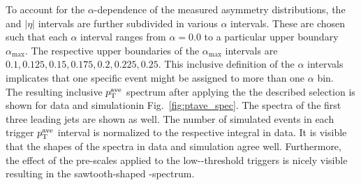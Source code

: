 \begin{table}[!t]
\centering
\caption{Overview of the $|\eta|$ and $\pt^\mathrm{ave}$ interval boundaries used for the resolution measurement.}
\label{tab:binning}
\end{table} 
To account for the $\alpha$-dependence of the measured asymmetry distributions, the \ptave and $|\eta|$ intervals are further subdivided in various $\alpha$ intervals. These are chosen such that each $\alpha$ interval ranges from $\alpha = 0.0$ to a particular upper boundary $\alpha_\mathrm{max}$. The respective upper boundaries of the $\alpha_\mathrm{max}$ intervals are $0.1, 0.125, 0.15, 0.175, 0.2, 0.225, 0.25$. This inclusive definition of the $\alpha$ intervals implicates that one specific event might be assigned to more than one $\alpha$ bin. \\
The resulting inclusive $\pt^\mathrm{ave}$ spectrum after applying the the described selection is shown for data and simulationin Fig.~\ref{fig:ptave_spec}. The \pt spectra of the first three leading jets are shown as well. The number of simulated events in each trigger $\pt^\mathrm{ave}$ interval is normalized to the respective integral in data. It is visible that the shapes of the spectra in data and simulation agree well. Furthermore, the effect of the pre-scales applied to the low-\ptave-threshold triggers is nicely visible resulting in the sawtooth-shaped \ptave-spectrum.  
